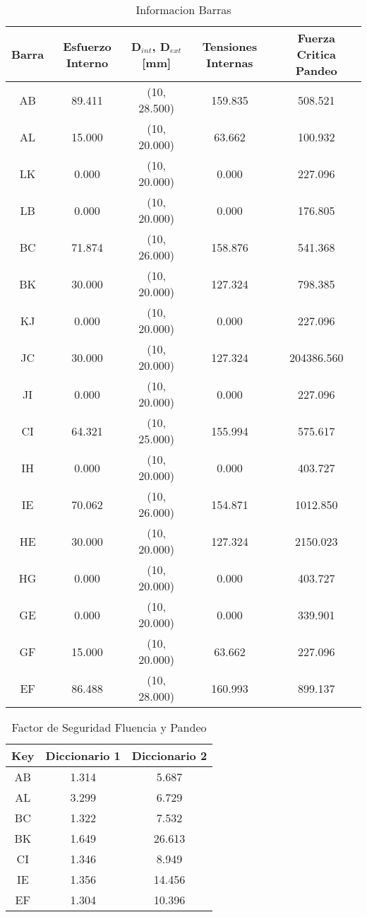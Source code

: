 \begin{table}[H]
    \centering
    \begin{tabular}{|c|c|c|c|c|}
    \hline
    \textbf{Barra} & \textbf{Esfuerzo Interno} & \textbf{D$_{int}$, D$_{ext}$ [mm]} & \textbf{Tensiones Internas} & \textbf{Fuerza Critica Pandeo} \\ 
    \hline
    AB & 89.411 & (10, 28.500) & 159.835 & 508.521 \\ 
    AL & 15.000 & (10, 20.000) & 63.662 & 100.932 \\ 
    LK & 0.000 & (10, 20.000) & 0.000 & 227.096 \\ 
    LB & 0.000 & (10, 20.000) & 0.000 & 176.805 \\ 
    BC & 71.874 & (10, 26.000) & 158.876 & 541.368 \\ 
    BK & 30.000 & (10, 20.000) & 127.324 & 798.385 \\ 
    KJ & 0.000 & (10, 20.000) & 0.000 & 227.096 \\ 
    JC & 30.000 & (10, 20.000) & 127.324 & 204386.560 \\ 
    JI & 0.000 & (10, 20.000) & 0.000 & 227.096 \\ 
    CI & 64.321 & (10, 25.000) & 155.994 & 575.617 \\ 
    IH & 0.000 & (10, 20.000) & 0.000 & 403.727 \\ 
    IE & 70.062 & (10, 26.000) & 154.871 & 1012.850 \\ 
    HE & 30.000 & (10, 20.000) & 127.324 & 2150.023 \\ 
    HG & 0.000 & (10, 20.000) & 0.000 & 403.727 \\ 
    GE & 0.000 & (10, 20.000) & 0.000 & 339.901 \\ 
    GF & 15.000 & (10, 20.000) & 63.662 & 227.096 \\ 
    EF & 86.488 & (10, 28.000) & 160.993 & 899.137 \\ 
    \hline
    \end{tabular}
    \caption{Informacion Barras}
\end{table}



\begin{table}[H]
\centering
\begin{tabular}{|c|c|c|}
\hline
\textbf{Key} & \textbf{Diccionario 1} & \textbf{Diccionario 2} \\ 
\hline
AB & 1.314 & 5.687 \\ 
AL & 3.299 & 6.729 \\ 
BC & 1.322 & 7.532 \\ 
BK & 1.649 & 26.613 \\ 
CI & 1.346 & 8.949 \\ 
IE & 1.356 & 14.456 \\ 
EF & 1.304 & 10.396 \\ 
\hline
\end{tabular}
\caption{Factor de Seguridad Fluencia y Pandeo}
\end{table}

